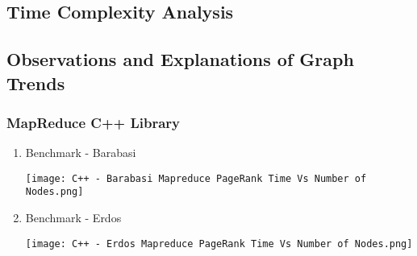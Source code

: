 \documentclass{article}
\begin{document}
    \subsection{Time Complexity Analysis}
    
        
    
    \clearpage
    
    \subsection{Observations and Explanations of Graph Trends}
    
    \subsubsection{MapReduce C++ Library}
    \begin{enumerate}
        \item Benchmark - Barabasi
        \begin{center}
            \texttt{[image: C++ - Barabasi Mapreduce PageRank Time Vs Number of Nodes.png]}
        \end{center}
            
        
        \item Benchmark - Erdos
        \begin{center}
            \texttt{[image: C++ - Erdos Mapreduce PageRank Time Vs Number of Nodes.png]}
        \end{center}
    \end{enumerate}
    
\end{document}
